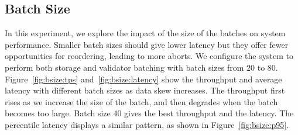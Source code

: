 \subsection{Batch Size}
In this experiment, we explore the impact of the size of the batches on system performance. 
Smaller batch sizes should give lower latency but they offer fewer opportunities for reordering, leading to more aborts. 
We configure the system to perform both storage and validator batching with batch sizes from $20$ to $80$.
Figure~\ref{fig:bsize:tps} and~\ref{fig:bsize:latency} show the throughput and average latency with different batch sizes as data skew increases. The throughput first rises as we increase the size of the batch, and then degrades when the batch becomes too large. Batch size 40 gives the best throughput and the latency. The percentile latency displays a similar pattern, as shown in Figure~\ref{fig:bsize:p95}.

